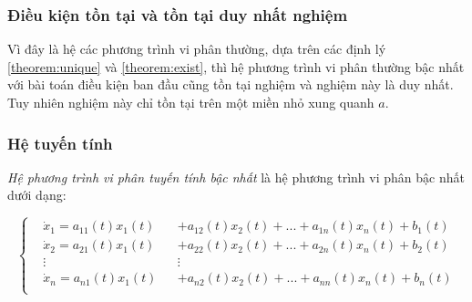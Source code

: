 \documentclass[a4paper]{article}
\begin{document}
\subsubsection{Điều kiện tồn tại và tồn tại duy nhất nghiệm}
Vì đây là hệ các phương trình vi phân thường, dựa trên các định lý \ref{theorem:unique} và \ref{theorem:exist}, thì hệ phương trình vi phân thường bậc nhất với bài toán điều kiện ban đầu cũng tồn tại nghiệm và nghiệm này là duy nhất. Tuy nhiên nghiệm này chỉ tồn tại trên một miền nhỏ xung quanh $a$.
\subsubsection{Hệ tuyến tính}
\textit{Hệ phương trình vi phân tuyến tính bậc nhất} là hệ phương trình vi phân bậc nhất dưới dạng:

\begin{equation}\label{eq:linear_sys}
    \left\{ \begin{alignedat}{4} 
        &\dot{x}_1 = a_{11}(t)x_1(t) && + a_{12}(t)x_2(t) + ... + a_{1n}(t)x_n(t) + b_1(t) \\
        &\dot{x}_2 = a_{21}(t)x_1(t) && + a_{22}(t)x_2(t) + ... + a_{2n}(t)x_n(t) + b_2(t) \\
        & \vdots                  && \vdots         \\
        &\dot{x}_n = a_{n1}(t)x_1(t) && + a_{n2}(t)x_2(t) + ... + a_{nn}(t)x_n(t) + b_n(t) \\
    \end{alignedat}
    \right.
\end{equation} \par
\end{document}
